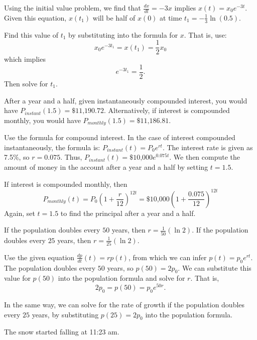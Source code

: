 \documentclass{ximera}
\begin{document}
\ans Using the initial value problem, we find that $\frac{dx}{dt} = -3x$
implies $x(t) = x_0e^{-3t}$.  Given this equation, $x(t_1)$ will be half
of $x(0)$ at time $t_1 = -\frac{1}{3} \ln(0.5)$.

\soln Find this value of $t_1$ by substituting into the formula for $x$. 
That is, use:
\[
x_0e^{-3t_1} = x(t_1) = \frac{1}{2}x_0
\]
which implies
\[ e^{-3t_1} = \frac{1}{2}. \]
Then solve for $t_1$.

\ans After a year and a half, given instantaneously compounded
interest, you would have
$P_{instant}(1.5) = \mbox{\$}11\mbox{,}190.72$.
Alternatively, if interest is compounded monthly, you would have
$P_{monthly}(1.5) = \mbox{\$}11\mbox{,}186.81$.

\soln Use the formula for compound interest.  In the case of interest
compounded instantaneously, the formula is:
$P_{instant}(t) = P_0e^{rt}$.  The interest rate is given as 7.5\%, so
$r = 0.075$.  Thus,
$P_{instant}(t) = \mbox{\$}10\mbox{,}000e^{0.075t}$.
We then compute the amount of money in the account after a year
and a half by setting $t = 1.5$.

\para If interest is compounded monthly, then
\[
P_{monthly}(t) = P_0\left(1 + \frac{r}{12}\right)^{12t} =
\mbox{\$}10\mbox{,}000\left(1 + \frac{0.075}{12}\right)^{12t}
\]
Again, set $t = 1.5$ to find the principal after a year and a half.

\ans If the population doubles every $50$ years, then
$r = \frac{1}{50}(\ln 2)$.  If the population doubles every $25$
years, then $r = \frac{1}{25}(\ln 2)$.

\soln Use the given equation $\frac{dp}{dt}(t) = rp(t)$,
from which we can infer $p(t) = p_0e^{rt}$.
The population doubles every $50$ years, so $p(50) = 2p_0$.  We
can substitute this value for $p(50)$ into the population formula
and solve for $r$.  That is,
\[
2p_0 = p(50) = p_0e^{50r}.
\]

In the same way, we can solve for the rate of growth if the population
doubles every $25$ years, by substituting $p(25) = 2p_0$ into the
population formula.

\newpage
{}
\ans The snow started falling at 11:23 am.
\end{document}
